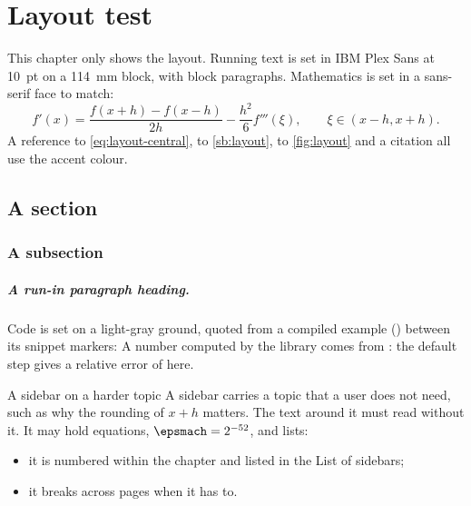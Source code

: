 \chapter{Layout test}\label{ch:layout}

This chapter only shows the layout. Running text is set in IBM Plex Sans at 10~pt on a 114~mm block, with
block paragraphs. Mathematics is
set in a sans-serif face to match:
\begin{equation}
  f'(x) = \frac{f(x+h) - f(x-h)}{2h} - \frac{h^2}{6} f'''(\xi), \qquad \xi \in (x-h, x+h).
  \label{eq:layout-central}
\end{equation}
A reference to \cref{eq:layout-central}, to
\cref{sb:layout}, to \cref{fig:layout} and a citation\cite{layout-test} all use the accent colour.

\section{A section}
\subsection{A subsection}
\paragraph{A run-in paragraph heading.} Code is set on a light-gray ground, quoted from a compiled example
() between its snippet markers:
A number computed by the library comes from : the default step gives a relative error of
\valTemplateDefaultError{} here.

\begin{sidebar}[label=sb:layout]{A sidebar on a harder topic}
A sidebar carries a topic that a user does not need, such as why the rounding of $x + h$ matters. The text
around it must read without it. It may hold equations, $\epsmach = 2^{-52}$, and lists:
\begin{itemize}
  \item it is numbered within the chapter and listed in the List of sidebars;
  \item it breaks across pages when it has to.
\end{itemize}
\end{sidebar}

